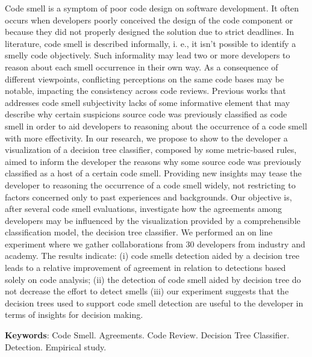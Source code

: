 \begin{resumo}

Code smell is a symptom of poor code design on software development. It often occurs when developers poorly conceived the design of the code component or because they did not properly designed the solution due to strict deadlines. In literature, code smell is described informally, i. e., it isn't possible to identify a smelly code objectively. Such informality may lead two or more developers to reason about each smell occurrence in their own way. As a consequence of different viewpoints, conflicting perceptions on the same code bases may be notable, impacting the consistency across code reviews. Previous works that addresses code smell subjectivity lacks of some informative element that may describe why certain suspicions source code was previously classified as code smell in order to aid developers to reasoning about the occurrence of a code smell with more effectivity. In our research, we propose to show to the developer a visualization of a decision tree classifier, composed by some metric-based rules, aimed to inform the developer the reasons why some source code was previously classified as a host of a certain code smell. Providing new insights may tease the developer to reasoning the occurrence of a code smell widely, not restricting to factors concerned only to past experiences and backgrounds. Our objective is, after several code smell evaluations, investigate how the agreements among developers may be influenced by the visualization provided by a comprehensible classification model, the decision tree classifier. We performed an on line experiment where we gather collaborations from 30  developers from industry and academy. The results indicate: (i) code smells detection aided by a decision tree leads to a relative improvement of agreement in relation to detections based solely on code analysis; (ii) the detection of code smell aided by decision tree do not decrease the effort to detect smells (iii) our experiment suggests that the decision trees used to support code smell detection are useful to the developer in terms of insights for decision making.
 
\textbf{Keywords}: Code Smell. Agreements. Code Review. Decision Tree Classifier. Detection. Empirical study.

\end{resumo}